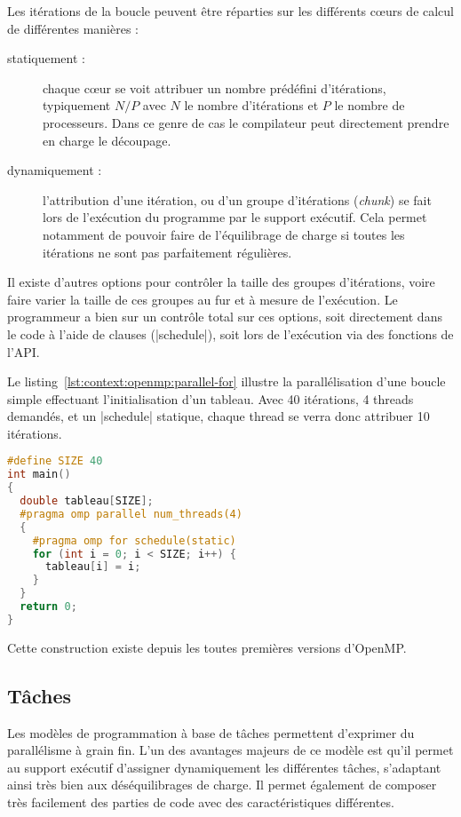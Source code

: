 Les itérations de la boucle peuvent être réparties sur les différents cœurs de calcul de différentes manières :
\begin{description}
  \item [statiquement :] chaque cœur se voit attribuer un nombre prédéfini d'itérations, typiquement $N/P$ avec $N$ le nombre d'itérations et $P$ le nombre de processeurs. Dans ce genre de cas le compilateur peut directement prendre en charge le découpage.
  \item [dynamiquement :] l'attribution d'une itération, ou d'un groupe d'itérations (\emph{chunk}) se fait lors de l'exécution du programme par le support exécutif. Cela permet notamment de pouvoir faire de l'équilibrage de charge si toutes les itérations ne sont pas parfaitement régulières.
\end{description}
Il existe d'autres options pour contrôler la taille des groupes d'itérations, voire faire varier la taille de ces groupes au fur et à mesure de l'exécution.
Le programmeur a bien sur un contrôle total sur ces options, soit directement dans le code à l'aide de clauses (|schedule|), soit lors de l'exécution via des fonctions de l'API.

Le listing~\ref{lst:context:openmp:parallel-for} illustre la parallélisation d'une boucle simple effectuant l'initialisation d'un tableau. Avec 40 itérations, 4 threads demandés, et un |schedule| statique, chaque thread se verra donc attribuer 10 itérations.

\begin{lstlisting}[language=c++,caption=Exemple d'utilisation d'un for,label=lst:context:openmp:parallel-for]
#define SIZE 40
int main()
{
  double tableau[SIZE];
  #pragma omp parallel num_threads(4)
  {
    #pragma omp for schedule(static)
    for (int i = 0; i < SIZE; i++) {
      tableau[i] = i;
    }
  }
  return 0;
}
\end{lstlisting}

Cette construction existe depuis les toutes premières versions d'OpenMP.


\subsection{Tâches}

Les modèles de programmation à base de tâches permettent d'exprimer du parallélisme à grain fin. L'un des avantages majeurs de ce modèle est qu'il permet au support exécutif d'assigner dynamiquement les différentes tâches, s'adaptant ainsi très bien aux déséquilibrages de charge. Il permet également de composer très facilement des parties de code avec des caractéristiques différentes.

